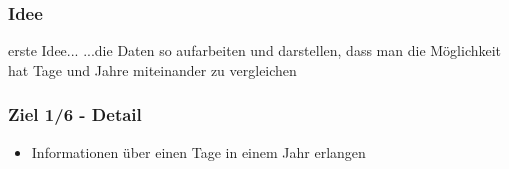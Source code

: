 \documentclass{beamer}
\begin{document}
\begin{frame}
\begin{columns}
\begin{figure}[h]
	\end{figure}
   \end{columns}
  \end{frame} 
  
  \begin{frame}
   \frametitle{Idee}
   \begin{block}{erste Idee...}
    ...die Daten so aufarbeiten und darstellen, dass man die Möglichkeit hat Tage und Jahre miteinander zu vergleichen
   \end{block}

  \end{frame}


  \begin{frame}
  \frametitle{Ziel 1/6 - Detail}
    \begin{itemize}
      \item Informationen über einen Tage in einem Jahr erlangen
    \end{itemize}
  \end{frame}  
  
\end{document}
